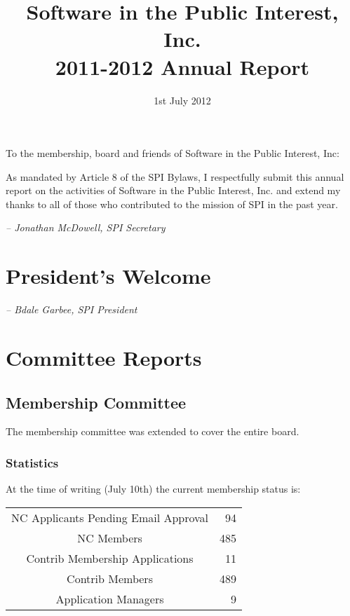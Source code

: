 \documentclass[letterpaper]{report}
\begin{document}
\title{Software in the Public Interest, Inc.\\
2011-2012 Annual Report}
\date{1st July 2012}

\maketitle

To the membership, board and friends of Software in the Public Interest, Inc:

As mandated by Article 8 of the SPI Bylaws, I respectfully submit this annual
report on the activities of Software in the Public Interest, Inc. and extend my
thanks to all of those who contributed to the mission of SPI in the past year.

  \emph{-- Jonathan McDowell, SPI Secretary}

\newpage

\tableofcontents

\newpage

\chapter{President's Welcome}
\label{sec:president}

  \emph{-- Bdale Garbee, SPI President}

\chapter{Committee Reports}
\section{Membership Committee}

The membership committee was extended to cover the entire board.

\subsection{Statistics}

At the time of writing (July 10th) the current membership status is:

\begin{tabular}{ | c | r | }
\hline
NC Applicants Pending Email Approval	& 94 \\
NC Members				& 485 \\
Contrib Membership Applications		& 11 \\
Contrib Members				& 489 \\
Application Managers			& 9 \\
\hline
\end{tabular}
\end{document}
